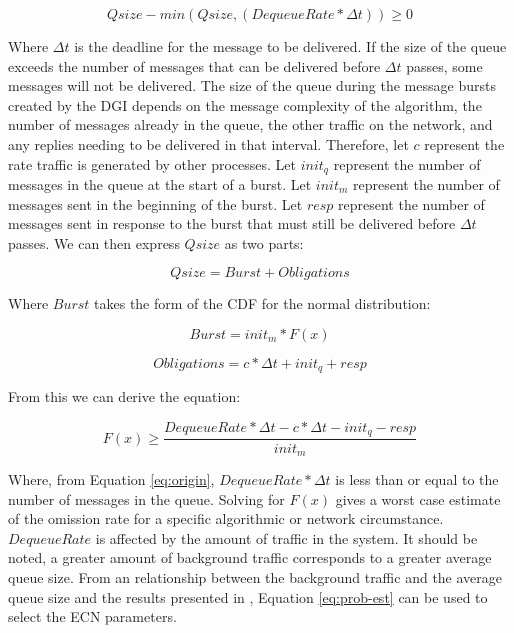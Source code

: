 \begin{equation}
Qsize - min(Qsize, (DequeueRate * \Delta t)) \geq 0
\label{eq:origin}
\end{equation}

Where $\Delta t$ is the deadline for the message to be delivered.
If the size of the queue exceeds the number of messages that can be delivered before $\Delta t$ passes, some messages will not be delivered.
The size of the queue during the message bursts created by the DGI depends on the message complexity of the algorithm, the number of messages already in the queue, the other traffic on the network, and any replies needing to be delivered in that interval.
Therefore, let $c$ represent the rate traffic is generated by other processes.
Let $init_q$ represent the number of messages in the queue at the start of a burst. 
Let $init_m$ represent the number of messages sent in the beginning of the burst.
Let $resp$ represent the number of messages sent in response to the burst that must still be delivered before $\Delta t$ passes.
We can then express $Qsize$ as two parts:

\begin{equation}
Qsize = Burst + Obligations
\end{equation}

Where $Burst$ takes the form of the \ac{CDF} for the normal distribution:

\begin{equation}
Burst = init_m * F(x)  
\end{equation}

\begin{equation}
Obligations = c * \Delta t + init_q + resp
\end{equation}

From this we can derive the equation:

\begin{equation}
F(x) \geq \frac{DequeueRate * \Delta t - c * \Delta t - init_q - resp}{init_m}
\label{eq:prob-est}
\end{equation}

Where, from Equation \ref{eq:origin}, $DequeueRate * \Delta t$ is less than or equal to the number of messages in the queue. 
Solving for $F(x)$ gives a worst case estimate of the omission rate for a specific algorithmic or network circumstance.
$DequeueRate$ is affected by the amount of traffic in the system. 
It should be noted, a greater amount of background traffic corresponds to a greater average queue size.
From an relationship between the background traffic and the average queue size and the results presented in \cite{JOURNAL}, Equation \ref{eq:prob-est} can be used to select the ECN parameters.

